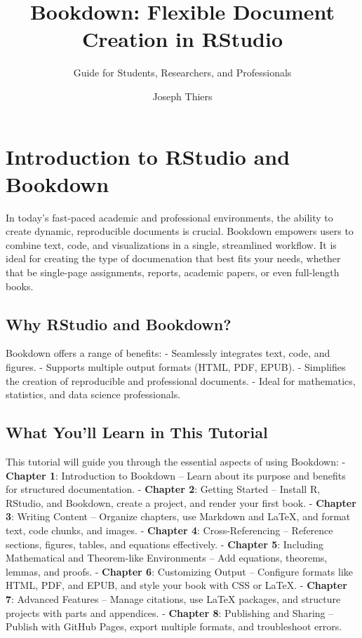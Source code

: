 \documentclass[
]{book}
\title{Bookdown: Flexible Document Creation in RStudio}
\subtitle{Guide for Students, Researchers, and Professionals}
\author{Joseph Thiers}
\date{}
\theoremstyle{definition}
\theoremstyle{definition}
\theoremstyle{definition}
\theoremstyle{definition}
\theoremstyle{remark}
\begin{document}
\maketitle

{
\setcounter{tocdepth}{1}
\tableofcontents
}
\chapter{Introduction to RStudio and Bookdown}\label{introduction-to-rstudio-and-bookdown}

In today's fast-paced academic and professional environments, the ability to create dynamic, reproducible documents is crucial. Bookdown empowers users to combine text, code, and visualizations in a single, streamlined workflow. It is ideal for creating the type of documenation that best fits your needs, whether that be single-page assignments, reports, academic papers, or even full-length books.

\section{Why RStudio and Bookdown?}\label{why-rstudio-and-bookdown}

Bookdown offers a range of benefits:
- Seamlessly integrates text, code, and figures.
- Supports multiple output formats (HTML, PDF, EPUB).
- Simplifies the creation of reproducible and professional documents.
- Ideal for mathematics, statistics, and data science professionals.

\section{What You'll Learn in This Tutorial}\label{what-youll-learn-in-this-tutorial}

This tutorial will guide you through the essential aspects of using Bookdown:
- \textbf{Chapter 1}: Introduction to Bookdown -- Learn about its purpose and benefits for structured documentation.
- \textbf{Chapter 2}: Getting Started -- Install R, RStudio, and Bookdown, create a project, and render your first book.
- \textbf{Chapter 3}: Writing Content -- Organize chapters, use Markdown and LaTeX, and format text, code chunks, and images.
- \textbf{Chapter 4}: Cross-Referencing -- Reference sections, figures, tables, and equations effectively.
- \textbf{Chapter 5}: Including Mathematical and Theorem-like Environments -- Add equations, theorems, lemmas, and proofs.
- \textbf{Chapter 6}: Customizing Output -- Configure formats like HTML, PDF, and EPUB, and style your book with CSS or LaTeX.
- \textbf{Chapter 7}: Advanced Features -- Manage citations, use LaTeX packages, and structure projects with parts and appendices.
- \textbf{Chapter 8}: Publishing and Sharing -- Publish with GitHub Pages, export multiple formats, and troubleshoot errors.
\end{document}
